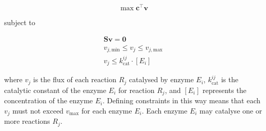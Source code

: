 \begin{equation}
  \max \mathbf{c}^{\intercal} \mathbf{v}
  \label{eq:model-gecko-fba-objective}
\end{equation}

subject to

\begin{equation}
  \begin{gathered}
    \mathbf{S} \mathbf{v} = \mathbf{0}\\
    v_{j,\mathrm{min}} \leq v_{j} \leq v_{j,\mathrm{max}}\\
    v_{j} \leq k_{\mathrm{cat}}^{ij} \cdot [E_{i}]
  \end{gathered}
  \label{eq:model-gecko-fba-constraints}
\end{equation}

where $v_{j}$ is the flux of each reaction $R_{j}$ catalysed by enzyme $E_{i}$, $k_{\mathrm{cat}}^{ij}$ is the catalytic constant of the enzyme $E_{i}$ for reaction $R_{j}$, and $[E_{i}]$ represents the concentration of the enzyme $E_{i}$.
Defining constraints in this way means that each $v_{j}$ must not exceed $v_{\mathrm{max}}$ for each enzyme $E_{i}$.
Each enzyme $E_{i}$ may catalyse one or more reactions $R_{j}$.




